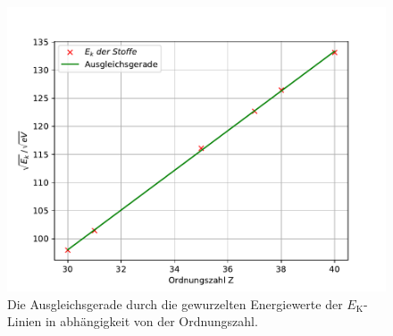 \begin{figure}
  \centering
  \includegraphics[width=\textwidth]{content/data/ausgleichsgerade.pdf}
  \caption{Die Ausgleichsgerade durch die gewurzelten Energiewerte der $E_\text{K}$-Linien in abhängigkeit von der Ordnungszahl.}
  \label{fig:ausgleich}
\end{figure}
